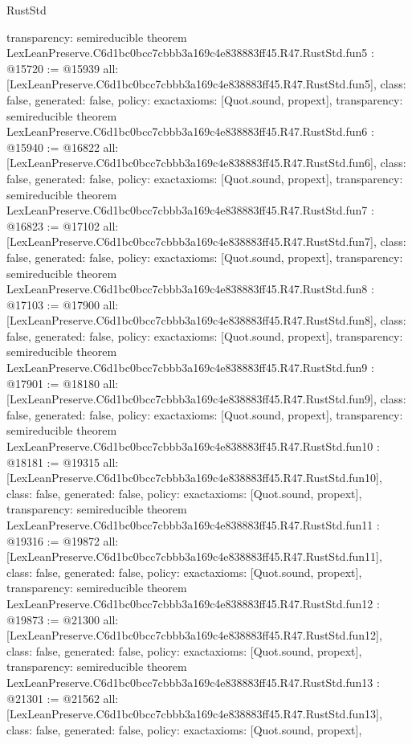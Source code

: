 \begin{lexlean}{RustStd}
\begin{coremodule}
{  transparency: semireducible
}
theorem LexLeanPreserve.C6d1bc0bcc7cbbb3a169c4e838883ff45.R47.RustStd.fun5 : @15720 := @15939 {
  all: [LexLeanPreserve.C6d1bc0bcc7cbbb3a169c4e838883ff45.R47.RustStd.fun5],
  class: false,
  generated: false,
  policy: exact{axioms: [Quot.sound, propext]},
  transparency: semireducible
}
theorem LexLeanPreserve.C6d1bc0bcc7cbbb3a169c4e838883ff45.R47.RustStd.fun6 : @15940 := @16822 {
  all: [LexLeanPreserve.C6d1bc0bcc7cbbb3a169c4e838883ff45.R47.RustStd.fun6],
  class: false,
  generated: false,
  policy: exact{axioms: [Quot.sound, propext]},
  transparency: semireducible
}
theorem LexLeanPreserve.C6d1bc0bcc7cbbb3a169c4e838883ff45.R47.RustStd.fun7 : @16823 := @17102 {
  all: [LexLeanPreserve.C6d1bc0bcc7cbbb3a169c4e838883ff45.R47.RustStd.fun7],
  class: false,
  generated: false,
  policy: exact{axioms: [Quot.sound, propext]},
  transparency: semireducible
}
theorem LexLeanPreserve.C6d1bc0bcc7cbbb3a169c4e838883ff45.R47.RustStd.fun8 : @17103 := @17900 {
  all: [LexLeanPreserve.C6d1bc0bcc7cbbb3a169c4e838883ff45.R47.RustStd.fun8],
  class: false,
  generated: false,
  policy: exact{axioms: [Quot.sound, propext]},
  transparency: semireducible
}
theorem LexLeanPreserve.C6d1bc0bcc7cbbb3a169c4e838883ff45.R47.RustStd.fun9 : @17901 := @18180 {
  all: [LexLeanPreserve.C6d1bc0bcc7cbbb3a169c4e838883ff45.R47.RustStd.fun9],
  class: false,
  generated: false,
  policy: exact{axioms: [Quot.sound, propext]},
  transparency: semireducible
}
theorem LexLeanPreserve.C6d1bc0bcc7cbbb3a169c4e838883ff45.R47.RustStd.fun10 : @18181 := @19315 {
  all: [LexLeanPreserve.C6d1bc0bcc7cbbb3a169c4e838883ff45.R47.RustStd.fun10],
  class: false,
  generated: false,
  policy: exact{axioms: [Quot.sound, propext]},
  transparency: semireducible
}
theorem LexLeanPreserve.C6d1bc0bcc7cbbb3a169c4e838883ff45.R47.RustStd.fun11 : @19316 := @19872 {
  all: [LexLeanPreserve.C6d1bc0bcc7cbbb3a169c4e838883ff45.R47.RustStd.fun11],
  class: false,
  generated: false,
  policy: exact{axioms: [Quot.sound, propext]},
  transparency: semireducible
}
theorem LexLeanPreserve.C6d1bc0bcc7cbbb3a169c4e838883ff45.R47.RustStd.fun12 : @19873 := @21300 {
  all: [LexLeanPreserve.C6d1bc0bcc7cbbb3a169c4e838883ff45.R47.RustStd.fun12],
  class: false,
  generated: false,
  policy: exact{axioms: [Quot.sound, propext]},
  transparency: semireducible
}
theorem LexLeanPreserve.C6d1bc0bcc7cbbb3a169c4e838883ff45.R47.RustStd.fun13 : @21301 := @21562 {
  all: [LexLeanPreserve.C6d1bc0bcc7cbbb3a169c4e838883ff45.R47.RustStd.fun13],
  class: false,
  generated: false,
  policy: exact{axioms: [Quot.sound, propext]},
}
\end{coremodule}
\end{lexlean}
